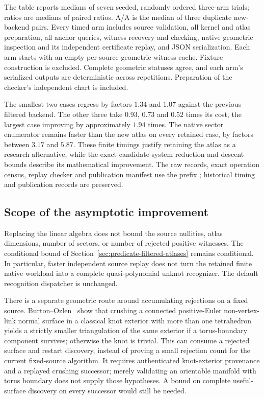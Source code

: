 \begin{center}
\small

\end{center}

The table reports medians of seven seeded, randomly ordered three-arm trials;
ratios are medians of paired ratios.  A/A is the median of three duplicate
new-backend pairs.  Every timed arm includes source validation, all kernel
and atlas preparation, all anchor queries, witness recovery and checking,
native geometric inspection and its independent certificate replay, and JSON
serialization.  Each arm starts with an empty per-source geometric witness
cache.  Fixture construction is excluded.  Complete geometric statuses agree,
and each arm's serialized outputs are deterministic across repetitions.
Preparation of the checker's independent chart is included.

The smallest two cases regress by factors $1.34$ and $1.07$ against the
previous filtered backend.  The other three take $0.93$, $0.73$ and $0.52$
times its cost, the largest case improving by approximately $1.94$ times.
The native sector enumerator remains faster than the new atlas on every
retained case, by factors between $3.17$ and $5.87$.  These finite timings
justify retaining the atlas as a research alternative, while the exact
candidate-system reduction and descent bounds describe its mathematical
improvement.  The raw records, exact operation census, replay checker and
publication manifest use the prefix ; historical timing
and publication records are preserved.

\subsection{Scope of the asymptotic improvement}

Replacing the linear algebra does not bound the source nullities, atlas
dimensions, number of sectors, or number of rejected positive witnesses.
The conditional bound of Section~\ref{sec:predicate-filtered-atlases} remains
conditional.  In particular, faster independent source replay does not turn
the retained finite native workload into a complete quasi-polynomial unknot
recognizer.  The default recognition dispatcher is unchanged.

There is a separate geometric route around accumulating rejections on a
fixed source.  Burton--Ozlen~\cite[Lemma~5]{burton-ozlen} show that crushing
a connected positive-Euler non-vertex-link normal surface in a classical
knot exterior with more than one tetrahedron yields a strictly smaller
triangulation of the same exterior if a torus-boundary component survives;
otherwise the knot is trivial.  This can consume a rejected surface and
restart discovery, instead of proving a small rejection count for the
current fixed-source algorithm.  It requires authenticated knot-exterior
provenance and a replayed crushing successor; merely validating an orientable
manifold with torus boundary does not supply those hypotheses.  A bound on
complete useful-surface discovery on every successor would still be needed.

